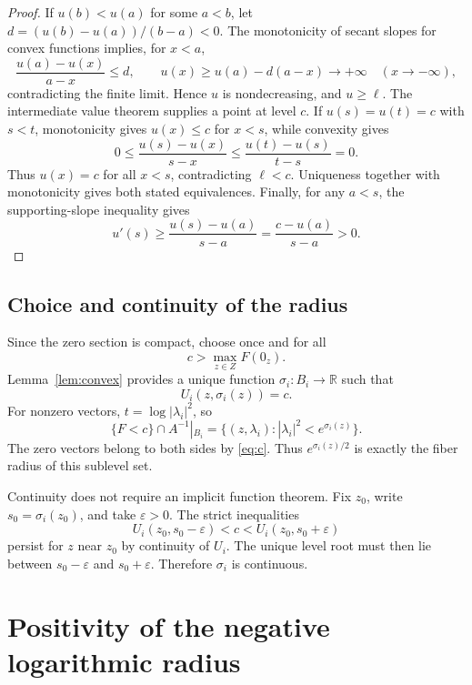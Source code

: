 \documentclass[11pt]{amsart}
\theoremstyle{definition}
\theoremstyle{remark}
\numberwithin{equation}{section}
\newcommand{\R}{\mathbb R}
\begin{document}
\begin{proof}
If $u(b)<u(a)$ for some $a<b$, let
$d=(u(b)-u(a))/(b-a)<0$. The monotonicity of secant slopes for convex
functions implies, for $x<a$,
\[
\frac{u(a)-u(x)}{a-x}\le d,
\qquad u(x)\ge u(a)-d(a-x)\longrightarrow+\infty
\quad(x\to-\infty),
\]
contradicting the finite limit. Hence $u$ is nondecreasing, and $u\ge\ell$.
The intermediate value theorem supplies a point at level $c$.
If $u(s)=u(t)=c$ with $s<t$, monotonicity gives
$u(x)\le c$ for $x<s$, while convexity gives
\[
0\le\frac{u(s)-u(x)}{s-x}\le
\frac{u(t)-u(s)}{t-s}=0.
\]
Thus $u(x)=c$ for all $x<s$, contradicting $\ell<c$.
Uniqueness together with monotonicity gives both stated equivalences.
Finally, for any $a<s$, the supporting-slope inequality gives
\begin{equation}\label{eq:positive-derivative}
u'(s)\ge\frac{u(s)-u(a)}{s-a}
=\frac{c-u(a)}{s-a}>0.
\end{equation}
\end{proof}

\subsection{Choice and continuity of the radius}

Since the zero section is compact, choose once and for all
\begin{equation}\label{eq:c}
c>\max_{z\in Z}F(0_z).
\end{equation}
Lemma~\ref{lem:convex} provides a unique function $\sigma_i:B_i\to\R$
such that
\begin{equation}\label{eq:radius-equation}
U_i(z,\sigma_i(z))=c.
\end{equation}
For nonzero vectors, $t=\log|\lambda_i|^2$, so
\begin{equation}\label{eq:disc-bundle}
\{F<c\}\cap A^{-1}|_{B_i}
=\{(z,\lambda_i):|\lambda_i|^2<e^{\sigma_i(z)}\}.
\end{equation}
The zero vectors belong to both sides by \eqref{eq:c}. Thus
$e^{\sigma_i(z)/2}$ is exactly the fiber radius of this sublevel set.

Continuity does not require an implicit function theorem. Fix $z_0$,
write $s_0=\sigma_i(z_0)$, and take $\varepsilon>0$. The strict
inequalities
\[
U_i(z_0,s_0-\varepsilon)<c<U_i(z_0,s_0+\varepsilon)
\]
persist for $z$ near $z_0$ by continuity of $U_i$. The unique level root
must then lie between $s_0-\varepsilon$ and $s_0+\varepsilon$.
Therefore $\sigma_i$ is continuous.

\section{Positivity of the negative logarithmic radius}
\end{document}
